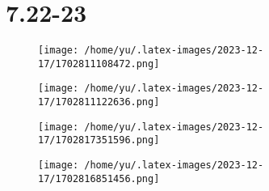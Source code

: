 \documentclass[14pt]{extarticle}
\begin{document}
\section{7.22-23}
\begin{figure}[H]
    \centering
    \texttt{[image: /home/yu/.latex-images/2023-12-17/1702811108472.png]}
\end{figure}
\begin{figure}[H]
    \centering
    \texttt{[image: /home/yu/.latex-images/2023-12-17/1702811122636.png]}
\end{figure}

\begin{figure}[H]
    \centering
    \texttt{[image: /home/yu/.latex-images/2023-12-17/1702817351596.png]}
\end{figure}

\begin{figure}[H]
    \centering
    \texttt{[image: /home/yu/.latex-images/2023-12-17/1702816851456.png]}
\end{figure}

\inputminted{cpp}{7.22-23.cpp}
\end{document}
